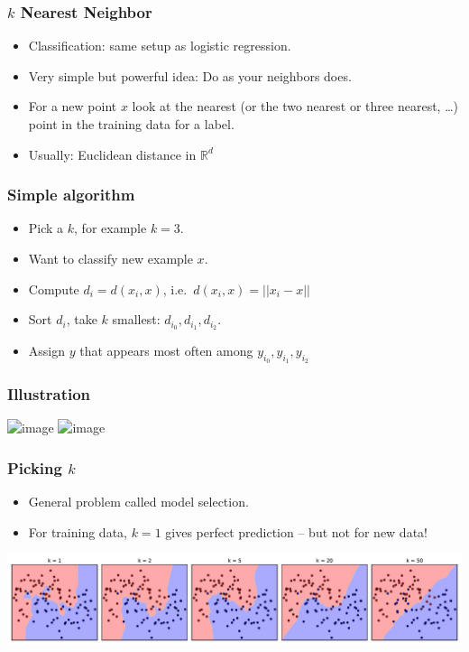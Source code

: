 \begin{frame}
    \frametitle{$k$ Nearest Neighbor}
    \begin{itemize}
        \item Classification: same setup as logistic regression.
        \item Very simple but powerful idea: Do as your neighbors does.
        \item For a new point $x$ look at the nearest (or the two nearest or three nearest, \ldots)
            point in the training data for a label.
        \item Usually: Euclidean distance in $\mathbb{R}^d$
    \end{itemize}
\end{frame}

\begin{frame}
    \frametitle{Simple algorithm}
    \begin{itemize}
        \item Pick a $k$, for example $k=3$.
        \item Want to classify new example $x$.
        \item Compute $d_i = d(x_i, x)$, i.e.\, $d(x_i, x) = ||x_i - x||$
        \item Sort $d_i$, take $k$ smallest: $d_{i_0}, d_{i_1}, d_{i_2}$.
        \item Assign $y$ that appears most often among $y_{i_0}, y_{i_1}, y_{i_2}$
    \end{itemize}
\end{frame}

\begin{frame}
    \frametitle{Illustration}
    \begin{center}
    \includegraphics<1>[width=.6\linewidth]{knn-pics/two_moons}
    \includegraphics<2>[width=.6\linewidth]{knn-pics/two_moons_k=5}
    \end{center}
\end{frame}

\begin{frame}
    \frametitle{Picking $k$}
    \begin{itemize}
        \item General problem called model selection.
        \item For training data, $k=1$ gives perfect prediction -- but not for new data!
    \end{itemize}
    \includegraphics[width=.98\linewidth]{knn-pics/two_moons_varying_k}
\end{frame}


